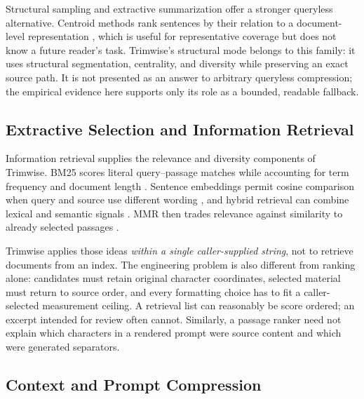 \documentclass[
]{article}
\begin{document}
Structural sampling and extractive summarization offer a stronger
queryless alternative. Centroid methods rank sentences by their relation
to a document-level representation \citep{radev-etal-2000-centroid},
which is useful for representative coverage but does not know a future
reader's task. Trimwise's structural mode belongs to this family: it
uses structural segmentation, centrality, and diversity while preserving
an exact source path. It is not presented as an answer to arbitrary
queryless compression; the empirical evidence here supports only its
role as a bounded, readable fallback.

\subsection{Extractive Selection and Information
Retrieval}\label{extractive-selection-and-information-retrieval}

Information retrieval supplies the relevance and diversity components of
Trimwise. BM25 scores literal query--passage matches while accounting
for term frequency and document length
\citep{robertson-zaragoza-2009-bm25}. Sentence embeddings permit cosine
comparison when query and source use different wording
\citep{reimers-gurevych-2019-sentence}, and hybrid retrieval can combine
lexical and semantic signals
\citep{bruch-gai-ingber-2023-hybrid-fusion}. MMR then trades relevance
against similarity to already selected passages
\citep{goldstein-carbonell-1998-mmr}.

Trimwise applies those ideas \emph{within a single caller-supplied
string}, not to retrieve documents from an index. The engineering
problem is also different from ranking alone: candidates must retain
original character coordinates, selected material must return to source
order, and every formatting choice has to fit a caller-selected
measurement ceiling. A retrieval list can reasonably be score ordered;
an excerpt intended for review often cannot. Similarly, a passage ranker
need not explain which characters in a rendered prompt were source
content and which were generated separators.

\subsection{Context and Prompt
Compression}\label{context-and-prompt-compression}
\end{document}
